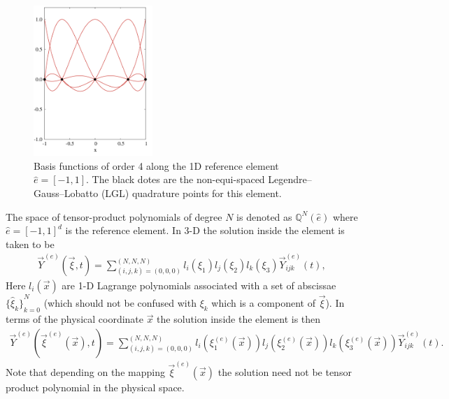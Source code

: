 \documentclass{report}
\numberwithin{equation}{section}
\begin{document}
 
 \begin{figure}[htbp]
\centering
\includegraphics[width=0.4\textwidth]{CLIMA-numerics/figures/LGL-lagrange.png}
\caption{Basis functions of order 4 along the 1D reference element $\hat{e} = [-1,1]$. The black dotes are the non-equi-spaced Legendre–Gauss–Lobatto (LGL) quadrature points for this element.}
\label{fig:LGL}
\end{figure}

The space of tensor-product polynomials of degree $N$
is denoted as $\mathbb{Q}^{N}(\hat{e})$ where $\hat{e} = {[-1, 1]}^d$ is the reference element. In 3-D the solution inside the element is taken to be
\begin{align}
  \vec{Y}^{(e)}(\vec{\xi}, t) = \sum_{(i,j,k) = (0,0,0)}^{(N,N,N)}
  l_{i}(\xi_{1}) l_{j}(\xi_{2}) l_{k}(\xi_{3})
  \vec{Y}_{ijk}^{(e)}(t),
\end{align}
Here $l_{i}(\vec{x})$ are 1-D Lagrange polynomials associated with a set of
abscissae ${\{\hat{\xi}_{k}\}}_{k=0}^{N}$ (which should not be confused with
$\xi_{k}$ which is a component of $\vec{\xi}$). In terms of the physical
coordinate $\vec{x}$ the solution inside the element is then
\begin{align}
  \vec{Y}^{(e)}(\vec{\xi}^{(e)}(\vec{x}), t) = \sum_{(i,j,k) = (0,0,0)}^{(N,N,N)}
  l_{i}(\xi_{1}^{(e)}(\vec{x})) l_{j}(\xi_{2}^{(e)}(\vec{x}))
  l_{k}(\xi_{3}^{(e)}(\vec{x}))
  \vec{Y}_{ijk}^{(e)}(t).
\end{align}
Note that depending on the mapping $\vec{\xi}^{(e)}(\vec{x})$ the solution need
not be tensor product polynomial in the physical space.
\end{document}
